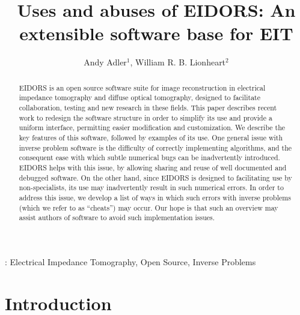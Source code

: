 \documentclass[12pt]{iopart}
\begin{document}
\title{Uses and abuses of EIDORS: An extensible software base for EIT}
\author{Andy Adler$^1$, William R. B. Lionheart$^2$}
\address{$^1$ School of Information Technology and Engineering,
              University of Ottawa, Canada}
\address{$^2$ School of Mathematics, University of Manchester, U.K.}

\begin{abstract} %

EIDORS is an open source software suite for image reconstruction in
electrical impedance tomography and diffuse optical tomography,
designed to facilitate collaboration, testing and new research
in these fields.  This paper describes recent work to
redesign the software structure in order to simplify its use
and provide a uniform interface,
permitting easier modification and customization.
We describe the key features of this software, followed by
examples of its use.
One general issue with inverse problem software is the difficulty
of correctly implementing algorithms, and the consequent ease with
which subtle numerical bugs can be inadvertently introduced.
EIDORS helps with this issue, by allowing sharing and reuse
of well documented and debugged software. On the other hand, 
since EIDORS is designed to facilitating use by non-specialists,
its use may inadvertently result in such numerical errors.
In order to address this issue, we develop a list of ways in
which such errors with inverse problems
 (which we refer to as ``cheats'') may occur.
Our hope is that such an overview may assist authors
of software to avoid such implementation issues.


\end{abstract}
:
Electrical Impedance Tomography,
Open Source,
Inverse Problems

\section{Introduction}
\end{document}
